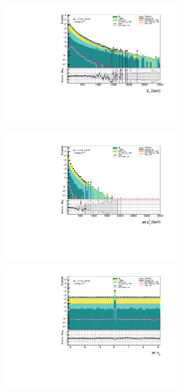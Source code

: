 \documentclass[12pt, a4paper]{book}
\begin{document}
\begin{figure}[!ht]
    \centering
    \begin{subfigure}[b]{0.49\textwidth}
        \centering
        \includegraphics[width=\textwidth]{et.pdf}
    \end{subfigure}
    \hfill
    \begin{subfigure}[b]{0.49\textwidth}
        \centering
        \includegraphics[width=\textwidth]{pt3_jet.pdf}
    \end{subfigure}
    \begin{subfigure}[b]{0.49\textwidth}
        \centering
        \includegraphics[width=\textwidth]{phi3_jet.pdf}

\end{subfigure}
\end{figure}
\end{document}
